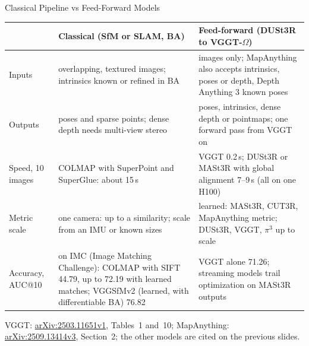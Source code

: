 \begin{frame}{Classical Pipeline vs Feed-Forward Models}
  \centering
  {\footnotesize\setlength{\tabcolsep}{4pt}
  \begin{tabular}{>{\raggedright\arraybackslash}p{2.0cm} >{\raggedright\arraybackslash}p{5.0cm} >{\raggedright\arraybackslash}p{5.6cm}}
    \toprule
     & \textbf{Classical (SfM or SLAM, BA)} & \textbf{Feed-forward (DUSt3R to VGGT-$\Omega$)} \\
    \midrule
    Inputs & overlapping, textured images; intrinsics known or refined in BA & images only; MapAnything also accepts intrinsics, poses or depth, Depth Anything 3 known poses \\
    \addlinespace[0.3em]
    Outputs & poses and sparse points; dense depth needs multi-view stereo & poses, intrinsics, dense depth or pointmaps; one forward pass from VGGT on \\
    \addlinespace[0.3em]
    Speed, 10 images & COLMAP with SuperPoint and SuperGlue: about 15\,s & VGGT 0.2\,s; DUSt3R or MASt3R with global alignment 7--9\,s (all on one H100) \\
    \addlinespace[0.3em]
    Metric scale & one camera: up to a similarity; scale from an IMU or known sizes & learned: MASt3R, CUT3R, MapAnything metric; DUSt3R, VGGT, $\pi^3$ up to scale \\
    \addlinespace[0.3em]
    Accuracy, AUC@10 & on IMC (Image Matching Challenge): COLMAP with SIFT 44.79, up to 72.19 with learned matches; VGGSfMv2 (learned, with differentiable BA) 76.82 & VGGT alone 71.26; streaming models trail optimization on MASt3R outputs \\
    \bottomrule
  \end{tabular}\par}
  \vspace{0.5em}
  {\scriptsize VGGT: \href{https://arxiv.org/abs/2503.11651v1}{arXiv:2503.11651v1}, Tables~1 and~10; MapAnything: \href{https://arxiv.org/abs/2509.13414v3}{arXiv:2509.13414v3}, Section~2; the other models are cited on the previous slides.\par}
\end{frame}

